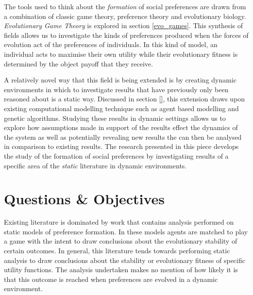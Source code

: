 \documentclass[11pt]{book}
\newcommand*{\np}{\par\noindent\newline}
\begin{document}
\np The tools used to think about the \textit{formation} of social preferences are drawn from a combination of classic game theory, preference theory and evolutionary biology.
\textit{Evolutionary Game Theory} is explored in section \ref{evo_games}.
This synthesis of fields allows us to investigate the kinds of preferences produced when the forces of evolution act of the preferences of individuals.
In this kind of model, an individual acts to maximise their own utility while their evolutionary fitness is determined by the object payoff that they receive.

\np A relatively novel way that this field is being extended is by creating dynamic environments in which to investigate results that have previously only been reasoned about is a static way.
Discussed in section \ref{}, this extension draws upon existing computational modelling technique such as agent based modelling and genetic algorithms.
Studying these results in dynamic settings allows us to explore how assumptions made in support of the results effect the dynamics of the system as well as potentially revealing new results the can then be analysed in comparison to existing results.
The research presented in this piece develops the study of the formation of social preferences by investigating results of a specific area of the \textit{static} literature in dynamic environments.


\section{Questions \& Objectives}\label{questions}
Existing literature is dominated by work that contains analysis performed on static models of preference formation.
In these models agents are matched to play a game with the intent to draw conclusions about the evolutionary stability of certain outcomes.
In general, this literature tends towards performing static analysis to draw conclusions about the stability or evolutionary fitness of specific utility functions.
The analysis undertaken makes no mention of how likely it is that this outcome is reached when preferences are evolved in a dynamic environment.
\end{document}
